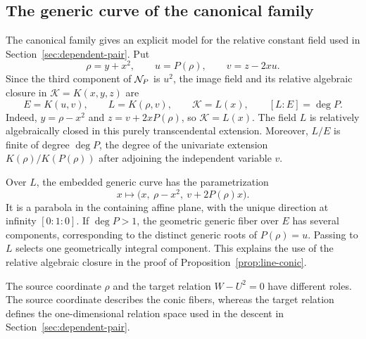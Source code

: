 

\subsection{The generic curve of the canonical family}\label{subsec:canonical-curve}
The canonical family gives an explicit model for the relative constant field used in Section~\ref{sec:dependent-pair}. Put
\[
 \rho=y+x^2,\qquad u=P(\rho),\qquad v=z-2xu.
\]
Since the third component of $\mathcal N_P$ is $u^2$, the image field and its relative algebraic closure in $\mathcal K=K(x,y,z)$ are
\begin{equation}\label{eq:canonical-fields}
 E=K(u,v),\qquad L=K(\rho,v),\qquad \mathcal K=L(x),\qquad [L:E]=\deg P.
\end{equation}
Indeed, $y=\rho-x^2$ and $z=v+2xP(\rho)$, so $\mathcal K=L(x)$. The field $L$ is relatively algebraically closed in this purely transcendental extension. Moreover, $L/E$ is finite of degree $\deg P$, the degree of the univariate extension $K(\rho)/K(P(\rho))$ after adjoining the independent variable $v$.

Over $L$, the embedded generic curve has the parametrization
\begin{equation}\label{eq:canonical-conic}
 x\longmapsto\bigl(x,\ \rho-x^2,\ v+2P(\rho)x\bigr).
\end{equation}
It is a parabola in the containing affine plane, with the unique direction at infinity $[0:1:0]$. If $\deg P>1$, the geometric generic fiber over $E$ has several components, corresponding to the distinct generic roots of $P(\rho)=u$. Passing to $L$ selects one geometrically integral component. This explains the use of the relative algebraic closure in the proof of Proposition~\ref{prop:line-conic}.

The source coordinate $\rho$ and the target relation $W-U^2=0$ have different roles. The source coordinate describes the conic fibers, whereas the target relation defines the one-dimensional relation space used in the descent in Section~\ref{sec:dependent-pair}.
